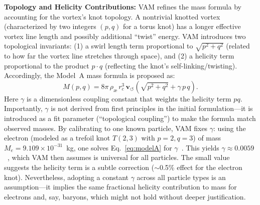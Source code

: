 \documentclass[a4paper,12pt]{article}
\begin{document}
    \textbf{Topology and Helicity Contributions:} VAM refines the mass formula by accounting for the vortex’s knot topology. A nontrivial knotted vortex (characterized by two integers $(p,q)$ for a torus knot) has a longer effective vortex line length and possibly additional ``twist'' energy. VAM introduces two topological invariants: (1) a swirl length term proportional to $\sqrt{p^2+q^2}$ (related to how far the vortex line stretches through space), and (2) a helicity term proportional to the product $p\cdot q$ (reflecting the knot’s self-linking/twisting). Accordingly, the Model~A mass formula is proposed as:
    \begin{equation}
        M(p,q) = 8\pi\,\rho_{\text{\ae}}\,r_c^3\,\mathbf{v}_{\scriptscriptstyle\boldsymbol{\circlearrowleft}} \left(\sqrt{p^2+q^2} + \gamma\,p\,q\right).
        \label{eq:modelA}
    \end{equation}
    Here $\gamma$ is a dimensionless coupling constant that weights the helicity term $pq$. Importantly, $\gamma$ is not derived from first principles in the initial formulation---it is introduced as a fit parameter (``topological coupling'') to make the formula match observed masses. By calibrating to one known particle, VAM fixes $\gamma$: using the electron (modeled as a trefoil knot $T(2,3)$ with $p=2, q=3$) of mass $M_e=9.109\times10^{-31}$~kg, one solves Eq.~\eqref{eq:modelA} for $\gamma$~\cite{vamfit}. This yields $\gamma \approx 0.0059$~\cite{vamfit}, which VAM then assumes is universal for all particles. The small value suggests the helicity term is a subtle correction ($\sim$0.5\% effect for the electron knot). Nevertheless, adopting a constant $\gamma$ across all particle types is an assumption---it implies the same fractional helicity contribution to mass for electrons and, say, baryons, which might not hold without deeper justification.
\end{document}
